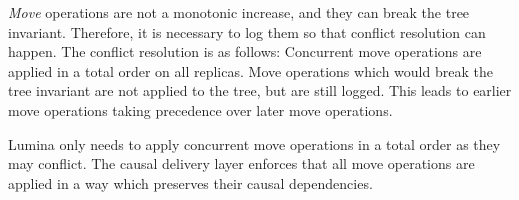 \documentclass[12pt]{report}
\newenvironment{bprooftree}
  {\leavevmode\hbox\bgroup}
  {\DisplayProof\egroup}
\begin{document}
\textit{Move} operations are not a monotonic increase, and they can break the tree invariant. Therefore, it is necessary to log them so that conflict resolution can happen. The conflict resolution is as follows: Concurrent move operations are applied in a total order on all replicas. Move operations which would break the tree invariant are not applied to the tree, but are still logged. This leads to earlier move operations taking precedence over later move operations. \par

Lumina only needs to apply concurrent move operations in a total order as they may conflict. The causal delivery layer enforces that all move operations are applied in a way which preserves their causal dependencies.


\end{document}
